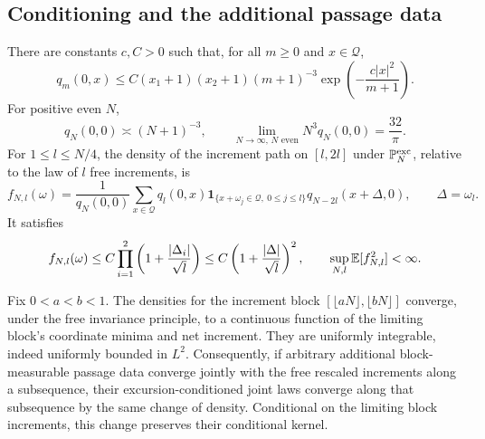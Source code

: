 \subsection{Conditioning and the additional passage data}

\begin{lemma}\label{tree:lem:excursion_density}
There are constants $c,C>0$ such that, for all $m\geq0$ and $x\in\mathcal Q$,
\begin{equation}\label{tree:eq:sphere_entrance_bound}
 q_m(0,x)\leq C(x_1+1)(x_2+1)(m+1)^{-3}
                 \exp\left(-\frac{c|x|^2}{m+1}\right).
\end{equation}
For positive even $N$,
\begin{equation}\label{tree:eq:sphere_return}
 q_N(0,0)\asymp (N+1)^{-3},\qquad
       \lim_{N\to\infty,\,N\text{ even}}N^3q_N(0,0)=\frac{32}{\pi}.
\end{equation}
For $1\leq l\leq N/4$, the density of the increment path on $[l,2l]$
under $\mathbb P_N^{\mathrm{exc}}$, relative to the law of $l$ free increments,
is
\begin{equation}\label{tree:eq:sphere_endpoint_density}
 f_{N,l}(\omega)=\frac{1}{q_N(0,0)}\sum_{x\in\mathcal Q}q_l(0,x)
  \mathbf1_{\{x+\omega_j\in\mathcal Q,\ 0\leq j\leq l\}}
                      q_{N-2l}(x+\Delta,0),\qquad \Delta=\omega_l.
\end{equation}
It satisfies
\begin{equation}\label{tree:eq:sphere_polynomial_density}
 f_{N,l}(\omega)\leq C\prod_{i=1}^2
       \left(1+\frac{|\Delta_i|}{\sqrt l}\right)
       \leq C\left(1+\frac{|\Delta|}{\sqrt l}\right)^2,
 \qquad \sup_{N,l}\mathbb E[f_{N,l}^2]<\infty.
\end{equation}

Fix $0<a<b<1$.  The densities for the increment block
$[\lfloor aN\rfloor,\lfloor bN\rfloor]$ converge, under the free
invariance principle, to a continuous function of the limiting block's
coordinate minima and net increment.  They are uniformly integrable,
indeed uniformly bounded in $L^2$.  Consequently, if arbitrary additional
block-measurable passage data converge jointly with the free rescaled
increments along a subsequence, their excursion-conditioned joint laws
converge along that subsequence by the same change of density.  Conditional
on the limiting block increments, this change preserves their conditional
kernel.
\end{lemma}

